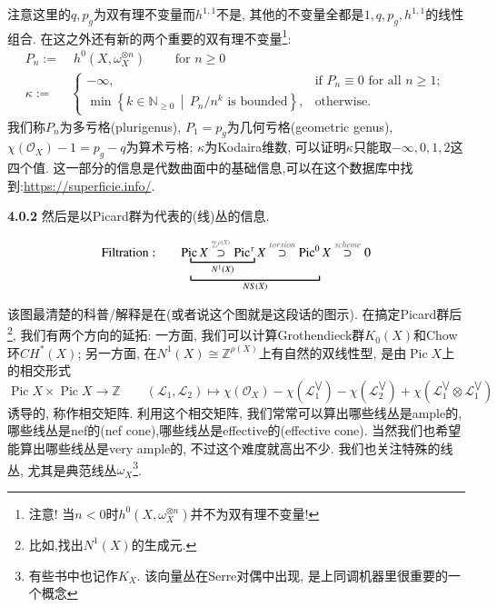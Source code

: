\documentclass[UTF8,12pt,twoside]{article}
\theoremstyle{definition}
\newcommand{\ZZ}{\mathbb{Z}}  %
\newcommand{\NN}{\mathbb{N}}  %
\newcommand{\Pic}{\operatorname{Pic}}
\numberwithin{equation}{section}
\begin{document}
注意这里的$q,p_g$为双有理不变量而$h^{1,1}$不是, 其他的不变量全都是$1,q,p_g,h^{1,1}$的线性组合. 在这之外还有新的两个重要的双有理不变量\footnote{注意! 当$n<0$时$h^0(X,\omega_X^{\otimes n})$并不为双有理不变量!}: 
\begin{equation*}
\begin{aligned}
P_n:=&\;h^0(X,\omega_X^{\otimes n}) \qquad \text{ for } n \geqslant 0\\
\kappa:=& \begin{cases}
-\infty, & \text{if }P_n \equiv 0 \text{ for all } n \geqslant 1;\\
\min \left\{ k \in \NN_{\geqslant 0} \,\middle|\, P_n/n^k \text{ is bounded} \right\},& \text{otherwise.}
\end{cases}
\end{aligned}
\end{equation*}
我们称$P_n$为多亏格(plurigenus), $P_1=p_g$为几何亏格(geometric genus), $\chi(\mathcal{O}_X)-1=p_g-q$为算术亏格; $ \kappa$为Kodaira维数, 可以证明$\kappa$只能取$-\infty,0,1,2$这四个值. 这一部分的信息是代数曲面中的基础信息,可以在这个数据库中找到:\url{https://superficie.info/}.

\textbf{4.0.2} 然后是以Picard群为代表的(线)丛的信息.

$$\mathrm{Filtration: }\qquad
\mathrm{P}\underbracket{\underbracket{\!\mathrm{ic}^{\!\!\phantom{0}}  X\overset{\textcolor[RGB]{102,102,102}{\mathbb{Z}^{\,\rho (X)}}}{\supset }\mathrm{Pic}^{\tau}}_{N^1(X)}X
	\overset{\textcolor[RGB]{102,102,102}{torsion}}{\supset}\mathrm{Pic}^0}_{NS(X)}X\overset{\textcolor[RGB]{102,102,102}{scheme}}{\supset}0
$$


该图最清楚的科普/解释是在\cite[18.4.10(with 24.7.5)]{vakil2017rising}(或者说这个图就是这段话的图示). 在搞定Picard群后\footnote{比如,找出$N^1(X)$的生成元.}, 我们有两个方向的延拓: 一方面, 我们可以计算Grothendieck群$K_0(X)$和Chow环$CH^*(X)$; 另一方面, 在$N^1(X)\cong \ZZ^{\rho(X)}$上有自然的双线性型, 是由$\Pic X$上的相交形式
$$\Pic X \times \Pic X \longrightarrow \ZZ \qquad (\mathcal{L}_1,\mathcal{L}_2) \longmapsto \chi(\mathcal{O}_X)-\chi(\mathcal{L}_1^{\bigvee})-\chi(\mathcal{L}_2^{\bigvee})+\chi(\mathcal{L}_1^{\bigvee} \otimes \mathcal{L}_1^{\bigvee})$$
诱导的, 称作相交矩阵. 利用这个相交矩阵, 我们常常可以算出哪些线丛是ample的,哪些线丛是nef的(nef cone),哪些线丛是effective的(effective cone). 当然我们也希望能算出哪些线丛是very ample的, 不过这个难度就高出不少. 我们也关注特殊的线丛, 尤其是典范线丛$\omega_X$\footnote{有些书中也记作$K_X$. 该向量丛在Serre对偶中出现, 是上同调机器里很重要的一个概念}.
\end{document}
